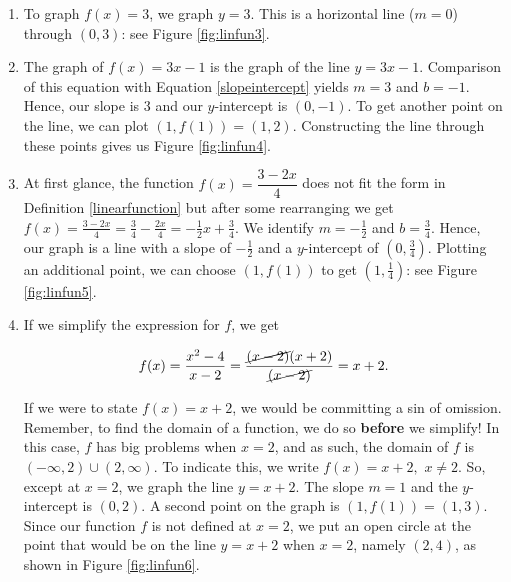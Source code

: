 {
\begin{enumerate}

\item To graph $f(x) = 3$, we graph $y=3$.  This is a horizontal line ($m=0$) through $(0,3)$: see Figure \ref{fig:linfun3}.


\item The graph of $f(x) = 3x-1$ is the graph of the line $y = 3x-1$.  Comparison of this equation with Equation \ref{slopeintercept} yields $m=3$ and $b = -1$.  Hence, our slope is $3$ and our $y$-intercept is $(0,-1)$.  To get another point on the line, we can plot $(1,f(1)) = (1,2)$.  Constructing the line through these points gives us Figure \ref{fig:linfun4}.


\item  At first glance, the function $f(x) = \dfrac{3 - 2x}{4}$ does not fit the form in Definition \ref{linearfunction} but after some rearranging we get $f(x) = \frac{3 - 2x}{4} = \frac{3}{4} - \frac{2x}{4} = -\frac{1}{2} x + \frac{3}{4}$.  We identify $m = -\frac{1}{2}$ and $b = \frac{3}{4}$.  Hence, our graph is a line with a slope of $-\frac{1}{2}$ and a $y$-intercept of $\left(0, \frac{3}{4}\right)$.  Plotting an additional point, we can choose $(1,f(1))$ to get $\left(1, \frac{1}{4}\right)$: see Figure \ref{fig:linfun5}.


\item  If we simplify the expression for $f$, we get

\[ f(x) = \dfrac{x^2-4}{x-2} = \dfrac{\cancel{(x-2)}(x+2)}{\cancel{(x-2)}} = x+2.\]

If we were to state $f(x) = x+2$, we would be committing a sin of omission.  Remember, to find the domain of a function, we do so \textbf{before} we simplify! In this case, $f$ has big problems when $x=2$, and as such,  the domain of $f$ is $(-\infty, 2) \cup (2,\infty)$.  To indicate this, we write $f(x) = x+2,$ $x \neq 2$.  So, except at $x=2$, we graph the line $y = x+2$.  The slope $m =1$ and the $y$-intercept is $(0,2)$.  A second point on the graph is $(1,f(1)) = (1,3)$.  Since our function $f$ is not defined at $x=2$, we put an open circle at the point that would be on the line $y=x+2$ when $x=2$, namely $(2,4)$, as shown in Figure \ref{fig:linfun6}.
\end{enumerate}
}

